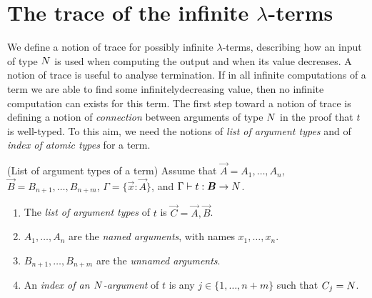 
\section{The trace of the infinite $\lambda$-terms}
We define a notion of trace for possibly infinite $\lambda$-terms, 
describing how an input of type ${N}$ is used when computing the output
and when its value decreases. A notion of trace is useful to analyse termination.
If in all infinite computations of a term we are able to find some infinitelydecreasing value, then no infinite computation can exists for this term. 
The first step toward a notion of  trace is defining a notion of \emph{connection} 
between arguments of type ${N}$ in the proof that $t$ is well-typed. 
To this aim, we need the notions of \emph{list of argument
 types} and of \emph{index of atomic types} for a term.

%
%


\begin{definition}(List of argument types of a term)
Assume that $\vec{A} = A_1, \ldots, A_n$, 
$\vec{B}=B_{n+1}, \ldots, B_{n+m}$, 
$\Gamma = \{\vec{x}:\vec{A}\}$,
and $\Gamma \vdash t: \vec{B} \rightarrow \N$.

\begin{enumerate}
\item
The \emph{list of argument types} of $t$ is $\vec{C} = \vec{A},\vec{B}$. 

\item
$A_1, \ldots, A_n$ are the \emph{named arguments}, 
with names $x_1, \ldots, x_n$.

\item
$B_{n+1}, \ldots, B_{n+m}$ are the \emph{unnamed arguments}.

\item
An \emph{index of an ${N}$-argument} 
of $t$ is any $j \in \{1, \ldots, n+m\}$ such that $C_j = {N}$.

\end{enumerate}
\end{definition}

